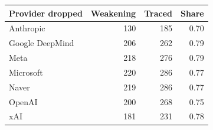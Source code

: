 \begin{tabular}{lrrr}\toprule Provider dropped & Weakening & Traced & Share \\ \midrule
Anthropic & 130 & 185 & 0.70 \\
Google DeepMind & 206 & 262 & 0.79 \\
Meta & 218 & 276 & 0.79 \\
Microsoft & 220 & 286 & 0.77 \\
Naver & 219 & 286 & 0.77 \\
OpenAI & 200 & 268 & 0.75 \\
xAI & 181 & 231 & 0.78 \\
\bottomrule\end{tabular}
